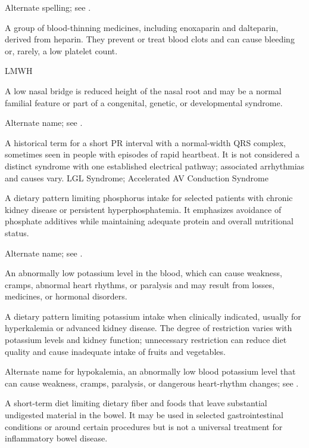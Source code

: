  Alternate spelling; see .

 A group of blood-thinning medicines, including enoxaparin and dalteparin, derived from heparin. They prevent or treat blood clots and can cause bleeding or, rarely, a low platelet count.

\synonyms
LMWH

 A low nasal bridge is reduced height of the nasal root and may be a normal familial feature or part of a congenital, genetic, or developmental syndrome.

 Alternate name; see .

 A historical term for a short PR interval with a normal-width QRS complex, sometimes seen in people with episodes of rapid heartbeat. It is not considered a distinct syndrome with one established electrical pathway; associated arrhythmias and causes vary.
\synonyms
LGL Syndrome; Accelerated AV Conduction Syndrome

 A dietary pattern limiting phosphorus intake for selected patients with chronic kidney
disease or persistent hyperphosphatemia. It emphasizes avoidance of phosphate additives
while maintaining adequate protein and overall nutritional status.

 Alternate name; see .

 An abnormally low potassium level in the blood, which can cause weakness, cramps, abnormal heart rhythms, or paralysis and may result from losses, medicines, or hormonal disorders.

 A dietary pattern limiting potassium intake when clinically indicated, usually for
hyperkalemia or advanced kidney disease. The degree of restriction varies with potassium
levels and kidney function; unnecessary restriction can reduce diet quality and cause inadequate intake of fruits and
vegetables.

 Alternate name for hypokalemia, an abnormally low blood potassium level that can cause weakness, cramps, paralysis, or dangerous heart-rhythm changes; see .

 A short-term diet limiting dietary fiber and foods that leave substantial undigested
material in the bowel. It may be used in selected gastrointestinal conditions or around
certain procedures but is not a universal treatment for inflammatory bowel disease.

